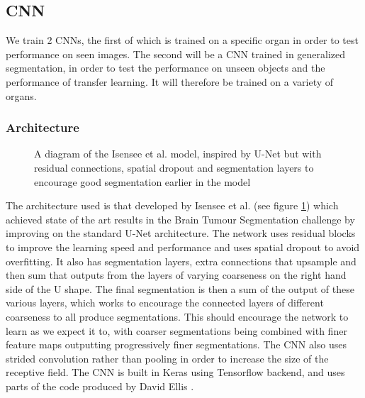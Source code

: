 \subsection{CNN}

We train 2 CNNs, the first of which is trained on a specific organ in order to test performance on seen images. The second will be a CNN trained in generalized segmentation, in order to test the performance on unseen objects and the performance of transfer learning. It will therefore be trained on a variety of organs.

\subsubsection{Architecture}

\begin{figure}[h!]
\centering
{}
\caption{A diagram of the Isensee et al. model, inspired by U-Net but with residual connections, spatial dropout and segmentation layers to encourage good segmentation earlier in the model \cite{UResNet}}
\label{fig:isensee}
\end{figure}

The architecture used is that developed by Isensee et al. \cite{UResNet} (see figure \ref{fig:isensee}) which achieved state of the art results in the Brain Tumour Segmentation challenge by improving on the standard U-Net architecture. The network uses residual blocks to improve the learning speed and performance and uses spatial dropout to avoid overfitting. It also has segmentation layers, extra connections that upsample and then sum that outputs from the layers of varying coarseness on the right hand side of the U shape. The final segmentation is then a sum of the output of these various layers, which works to encourage the connected layers of different coarseness to all produce segmentations. This should encourage the network to learn as we expect it to, with coarser segmentations being combined with finer feature maps outputting progressively finer segmentations. The CNN also uses strided convolution rather than pooling in order to increase the size of the receptive field. The CNN is built in Keras using Tensorflow backend, and uses parts of the code produced by David Ellis \cite{uNetGit}.


